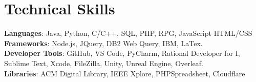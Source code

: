 \documentclass[letterpaper,11pt]{article}
\begin{document}
%
\section{Technical Skills}
 \begin{itemize}[leftmargin=0.15in, label={}]
    \small{\item{
     \textbf{Languages}{: Java, Python, C/C++, SQL, PHP, RPG, JavaScript HTML/CSS} \\
     \textbf{Frameworks}{: Node.js, JQuery, DB2 Web Query, IBM, LaTex.} \\
     \textbf{Developer Tools}{: GitHub, VS Code, PyCharm, Rational Developer for I, Sublime Text, Xcode, FileZilla, Unity, Unreal Engine, Overleaf.} \\
     \textbf{Libraries}{: ACM Digital Library, IEEE Xplore, PHPSpreadsheet, Cloudflare}
    }}
 \end{itemize}


\end{document}
